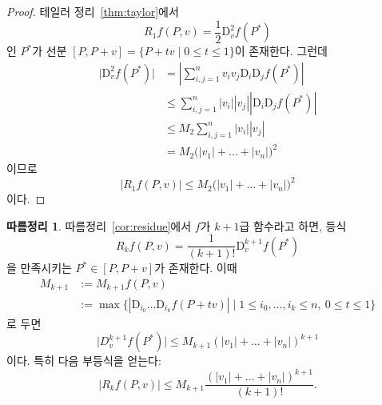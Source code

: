 \documentclass[unfonts,oneside,a4paper]{oblivoir}
\theoremstyle{definition}
\theoremstyle{theorem}
\newtheorem{corollary}{따름정리}[subsubsection]
\renewcommand{\vec}[1]{\bm{\mathit{#1}}}
\newcommand{\dD}{\mathrm{D}}
\begin{document}
\begin{proof}
    테일러 정리~\ref{thm:taylor}에서
    \begin{equation*}
        R_1 f(P, \vec v) = \frac 12 \dD_{\vec v}^2 f(P^*)
    \end{equation*}
    인 $P^*$가 선분 $[P, P + \vec v] = \{P + t \vec v \mid 0 \leq t \leq 1\}$이 존재한다.
    그런데
    \begin{align*}
        \bigl| \dD_{\vec v} ^2 f(P^*) \bigr| &= \left| \sum_{i, j = 1}^n v_i v_j \dD_i \dD_j f(P^*) \right|\\
                                             &\leq \sum_{i, j = 1}^n |v_i| |v_j| |\dD_i \dD_j f(P^*)|\\
                                             &\leq M_2 \sum_{i, j = 1}^n |v_i| |v_j|\\
                                             &= M_2 \bigl( |v_1| + \dots + |v_n| \bigr)^2
    \end{align*}
    이므로
    \begin{equation*}
        | R_1 f(P, \vec v) | \leq M_2 \bigl( |v_1| + \dots + |v_n| \bigr)^2
    \end{equation*}
    이다.
\end{proof}

\begin{corollary}
    따름정리~\ref{cor:residue}에서 $f$가 $k + 1$급 함수라고 하면, 등식
    \begin{equation*}
        R_k f(P, \vec v) = \frac{1}{(k + 1)!} \dD_{\vec v}^{k + 1} f(P^*)
    \end{equation*}
    을 만족시키는 $P^* \in [P, P + \vec v]$가 존재한다.
    이때
    \begin{align*}
        M_{k + 1} &:= M_{k + 1} f(P, \vec v)\\
                  &:= \max \{|\dD_{i_0} \dots \dD_{i_k} f(P + t \vec v)| \mid 1 \leq i_0, \dots, i_k \leq n,\ 0 \leq t \leq 1\}
    \end{align*}
    로 두면
    \begin{equation*}
        \bigl|D_{\vec v}^{k + 1} f(P^*)\bigr| \leq M_{k + 1} (|v_1| + \dots + |v_n|)^{k + 1}
    \end{equation*}
    이다.
    특히 다음 부등식을 얻는다:
    \begin{equation*}
        |R_k f(P, \vec v)| \leq M_{k + 1} \frac{(|v_1| + \dots + |v_n|)^{k + 1}}{(k + 1)!}.
    \end{equation*}
\end{corollary}
\end{document}
